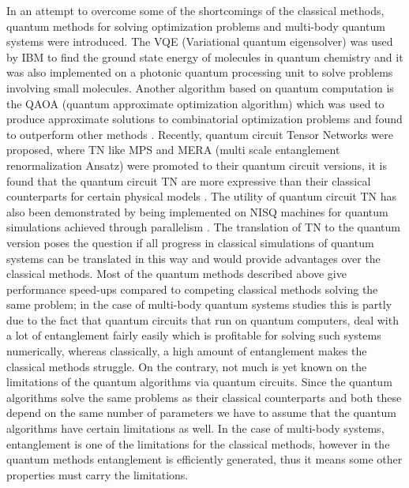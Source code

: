 \documentclass{physics_article}
\begin{document}
	In an attempt to overcome some of the shortcomings of the classical methods, quantum methods for solving optimization problems and multi-body quantum systems were introduced. The VQE (Variational quantum eigensolver) was used by IBM to find the ground state energy of molecules in  quantum chemistry \cite{kandala_mezzacapo_temme_takita_brink_chow_gambetta_2017} and it was also implemented on a photonic quantum processing unit \cite{peruzzo_mcclean_shadbolt_yung_zhou_love_aspuru-guzik_obrien_2014} to solve problems involving small molecules. Another algorithm based on quantum computation is the QAOA (quantum approximate optimization algorithm) which was used to produce approximate solutions to combinatorial optimization problems \cite{https://doi.org/10.48550/arxiv.1411.4028} and found to outperform other methods \cite{PhysRevX.10.021067}. Recently, quantum circuit Tensor Networks were proposed, where TN like MPS and MERA (multi scale entanglement renormalization Ansatz)\cite{vidal_2008} were promoted to their quantum circuit versions, it is found that the quantum circuit TN are more expressive than their classical counterparts for certain physical models \cite{haghshenas_gray_potter_chan_2022}. The utility of quantum circuit TN has also been demonstrated by being implemented on NISQ machines for quantum simulations achieved through parallelism \cite{barratt_dborin_bal_stojevic_pollmann_green_2021}. The translation of TN to the quantum version poses the question if all progress in classical simulations of quantum systems can be translated in this way and would provide advantages over the classical methods. Most of the quantum methods described above give performance speed-ups compared to competing classical methods solving the same problem; in the case of multi-body quantum systems studies this is partly due to the fact that quantum circuits that run on quantum computers, deal with a lot of entanglement fairly easily which is profitable for solving such systems numerically, whereas classically, a high amount of entanglement makes the classical methods struggle. On the contrary, not much is yet known on the limitations of the quantum algorithms via quantum circuits. Since the quantum algorithms solve the same problems as their classical counterparts and both these depend on the same number of parameters we have to assume that the quantum algorithms have certain limitations as well. In the case of multi-body systems, entanglement is one of the limitations for the classical methods, however in the quantum methods entanglement is efficiently generated, thus it means some other properties must carry the limitations. 
\end{document}
